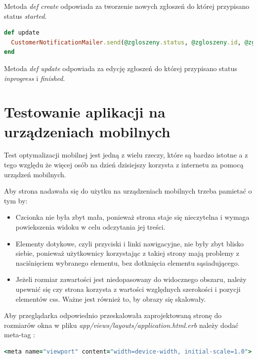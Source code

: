 \documentclass[openright]{xmgr}
\begin{document}
	Metoda \textit{def create} odpowiada za tworzenie nowych zgłoszeń do której przypisano status \textit{started}.
	
	\begin{lstlisting}[language=Ruby,lineskip={-1pt},caption=Powiadomienia o rozpoczeciu i zakończeniu naprawy usterki]
def update
  CustomerNotificationMailer.send(@zgloszeny.status, @zgloszeny.id, @zgloszeny.user_id).deliver_later if !@zgloszeny.started?
end
	\end{lstlisting}
	
	Metoda \textit{def update} odpowiada za edycję zgłoszeń do której przypisano status \textit{inprogress} i \textit{finished}.
	
	\chapter{Testowanie aplikacji na urządzeniach mobilnych}
	
	Test optymalizacji mobilnej jest jedną z wielu rzeczy, które są bardzo istotne a z tego względu że więcej osób na dzień dzisiejszy korzysta z internetu za pomocą urządzeń mobilnych. 

	Aby strona nadawała się do użytku na urządzeniach mobilnych trzeba pamietać o tym by:
	
	\begin{itemize}
		\item Czcionka nie była zbyt mała, ponieważ strona staje się nieczytelna i wymaga powiekszenia widoku w celu odczytania jej treści.
		\item Elementy dotykowe, czyli przyciski i linki nawigacyjne, nie były zbyt blisko siebie, ponieważ użytkownicy korzystając z takiej strony mają problemy z naciśnięciem wybranego elementu, bez dotknięcia elementu sąsiadującego.
		\item Jeżeli rozmiar zawartości jest niedopasowany do widocznego obszaru, należy upewnić się czy strona korzysta z wartości względnych szerokości i pozycji elementów css. Ważne jest również to, by obrazy się skalowały.
	\end{itemize}
	
	\newpage
	Aby przeglądarka odpowiednio przeskalowała zaprojektowaną stronę do rozmiarów okna w pliku \textit{app/views/layouts/application.html.erb} należy dodać meta-tag \cite{framework}:
	
	\begin{lstlisting}[language=Ruby,lineskip={-1pt},caption=Meta tag odpowiedzialny za skalowanie]
<meta name="viewport" content="width=device-width, initial-scale=1.0">
	\end{lstlisting}
	
\end{document}
